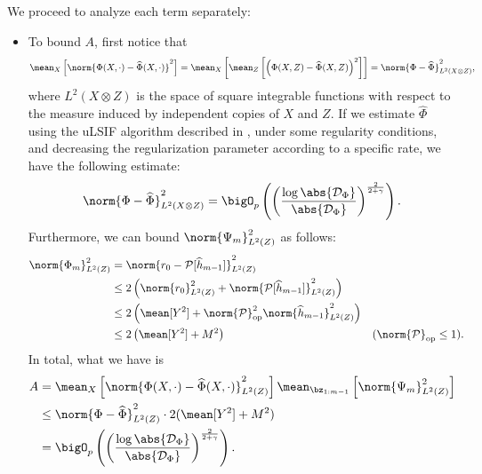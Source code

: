 We proceed to analyze each term separately:
\begin{itemize}
    \item To bound $ A $, first notice that
        \begin{align*}
            \mean_{ X } \left[
                \norm{ \Phi ( X, \cdot ) - \hat{ \Phi } ( X, \cdot ) }^2
            \right]
            = \mean_{ X } \left[
                \mean_{ Z } \left[
                    \left(
                        \Phi ( X, Z ) - \hat{ \Phi } ( X, Z )
                    \right)^2
                \right]
            \right]
            = \norm{ \Phi - \hat{ \Phi } }_{ L^2 ( X \otimes Z ) }^2
        ,\end{align*}
        where $ L^2 ( X \otimes Z ) $ is the space of square integrable functions with respect to the measure induced by independent copies of $ X $ and $ Z $.
        If we estimate $ \hat{ \Phi } $ using the uLSIF algorithm described in \cite{sugiyama2012}, under some regularity conditions, and decreasing the regularization parameter according to a specific rate, we have the following estimate: 
        \begin{equation*}
            \norm{ \Phi - \hat{ \Phi } }^2_{ L^2 ( X \otimes Z ) }
            = \bigO_{ p } \left(
                \left(
                    \frac{ \log \abs{ \data_{ \Phi } } }{ \abs{ \data_{ \Phi } } }
                \right)^{ \frac{ 2 }{ 2 + \gamma } }
            \right)
        .\end{equation*}
    Furthermore, we can bound $ \norm{ \Psi_{ m } }_{ L^2 ( Z ) }^2 $ as follows:
    \begin{align*}
        \norm{ \Phi_{ m } }_{ L^2 ( Z ) }^2
        &= \norm{ r_{ 0 } - \meanop [ \hat{ h }_{ m-1 } ] }_{ L^2 ( Z ) }^2 \\
        &\leq 2 \left(
            \norm{ r_{ 0 } }_{ L^{ 2 } ( Z ) }^2
            + \norm{ \meanop [ \hat{ h }_{ m-1 } ] }_{ L^{ 2 } ( Z ) }^2
        \right) \\
        &\leq 2 \left(
            \mean [ Y^2 ] + \norm{ \meanop }_{ \mathrm{op} }^2 \norm{ \hat{ h }_{ m-1 } }_{ L^{ 2 } ( Z ) }^2
        \right) \\
        &\leq 2 \left(
            \mean [ Y^2 ] + M^2
        \right)
        &&( \norm{ \meanop }_{ \mathrm{op} } \leq 1 )
    .\end{align*}
    In total, what we have is
    \begin{align*}
        A &= \mean_{ X } \left[
            \norm{ \Phi ( X, \cdot ) - \hat{ \Phi } ( X, \cdot ) }_{ L^{ 2 } ( Z ) }^2
        \right]
        \mean_{ \bz_{ 1:m-1 } } \left[
            \norm{ \Psi_{ m } }_{ L^{ 2 } ( Z ) }^2
        \right] \\
        &\leq \norm{ \Phi - \hat{ \Phi } }_{ L^{ 2 } ( Z ) }^2
        \cdot 2 ( \mean [ Y^2 ] + M^2 ) \\
        &= \bigO_{ p } \left(
            \left(
                \frac{ \log \abs{ \data_{ \Phi } } }{ \abs{ \data_{ \Phi } } }
            \right)^{ \frac{ 2 }{ 2 + \gamma } }
        \right)
    .\end{align*}


\end{itemize}
